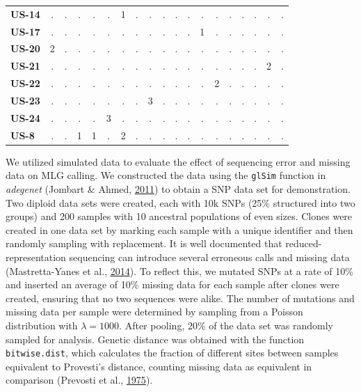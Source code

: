 \documentclass[double,11pt]{beavtex}
\begin{document}
\begin{table}
\begin{tabular}{l|cccccccccccccccccc}
    \textbf{US-14} & . & . & . & . & . & 1 & . & . & . & . & . & . & . & . & . & . & . & . \\ 
    \textbf{US-17} & . & . & . & . & . & . & . & . & . & . & . & 1 & . & . & . & . & . & . \\ 
    \textbf{US-20} & 2 & . & . & . & . & . & . & . & . & . & . & . & . & . & . & . & . & . \\ 
    \textbf{US-21} & . & . & . & . & . & . & . & . & . & . & . & . & . & . & . & . & 2 & . \\ 
    \textbf{US-22} & . & . & . & . & . & . & . & . & . & . & . & . & 2 & . & . & . & . & . \\ 
    \textbf{US-23} & . & . & . & . & . & . & . & 3 & . & . & . & . & . & . & . & . & . & . \\ 
    \textbf{US-24} & . & . & . & . & 3 & . & . & . & . & . & . & . & . & . & . & . & . & . \\ 
    \textbf{US-8} & . & . & 1 & 1 & . & 2 & . & . & . & . & . & . & . & . & . & . & . & . \\ 
     \bottomrule
  \end{tabular}
  \end{table}\newpage
  
  We utilized simulated data to evaluate the effect of sequencing error
  and missing data on MLG calling. We constructed the data using the
  \texttt{glSim} function in \emph{adegenet} (Jombart \& Ahmed,
  \protect\hyperlink{ref-jombart2011adegenet}{2011}) to obtain a SNP data
  set for demonstration. Two diploid data sets were created, each with 10k
  SNPs (25\% structured into two groups) and 200 samples with 10 ancestral
  populations of even sizes. Clones were created in one data set by
  marking each sample with a unique identifier and then randomly sampling
  with replacement. It is well documented that reduced- representation
  sequencing can introduce several erroneous calls and missing data
  (Mastretta-Yanes et al.,
  \protect\hyperlink{ref-mastretta2015restriction}{2014}). To reflect
  this, we mutated SNPs at a rate of 10\% and inserted an average of 10\%
  missing data for each sample after clones were created, ensuring that no
  two sequences were alike. The number of mutations and missing data per
  sample were determined by sampling from a Poisson distribution with
  \(\lambda = 1000\). After pooling, 20\% of the data set was randomly
  sampled for analysis. Genetic distance was obtained with the function
  \texttt{bitwise.dist}, which calculates the fraction of different sites
  between samples equivalent to Provesti's distance, counting missing data
  as equivalent in comparison (Prevosti et al.,
  \protect\hyperlink{ref-prevosti1975distances}{1975}).
  
\end{document}
